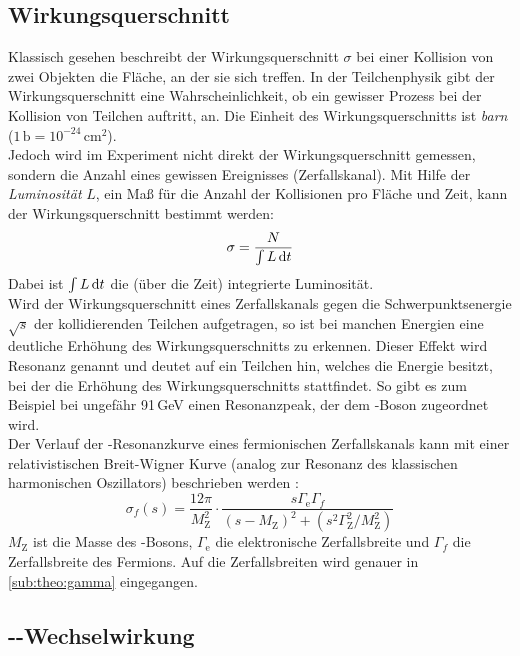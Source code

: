 \subsection{Wirkungsquerschnitt}
Klassisch gesehen beschreibt der Wirkungsquerschnitt $\sigma$ bei einer Kollision von zwei Objekten die Fläche, an der sie sich treffen. 
In der Teilchenphysik gibt der Wirkungsquerschnitt eine Wahrscheinlichkeit, ob ein gewisser Prozess bei der Kollision von Teilchen auftritt, an.
Die Einheit des Wirkungsquerschnitts ist \emph{barn} ($1\,\text{b} = 10^{-24}\,\text{cm}^2$). \\
Jedoch wird im Experiment nicht direkt der Wirkungsquerschnitt gemessen, sondern die Anzahl eines gewissen Ereignisses (Zerfallskanal). Mit Hilfe 
der \emph{Luminosität} $L$, ein Maß für die Anzahl der Kollisionen pro Fläche und Zeit, kann der Wirkungsquerschnitt bestimmt werden:
\begin{equation}
    \sigma = \frac{N}{\int L \, \mathrm{d} t}
\end{equation}
Dabei ist $\int L \, \mathrm{d} t$ die (über die Zeit) integrierte Luminosität. \\
Wird der Wirkungsquerschnitt eines Zerfallskanals gegen die Schwerpunktsenergie $\sqrt{s}$ der kollidierenden Teilchen aufgetragen, so ist  
bei manchen Energien eine deutliche Erhöhung des Wirkungsquerschnitts zu erkennen. Dieser Effekt wird Resonanz genannt und deutet auf ein Teilchen 
hin, welches die Energie besitzt, bei der die Erhöhung des Wirkungsquerschnitts stattfindet. 
So gibt es zum Beispiel bei ungefähr 91\,GeV einen Resonanzpeak, der dem \Z-Boson zugeordnet wird. \\
Der Verlauf der  \Z-Resonanzkurve eines fermionischen Zerfallskanals kann mit einer relativistischen Breit-Wigner Kurve (analog zur Resonanz des 
klassischen harmonischen Oszillators) beschrieben werden \cite{manual}:
\begin{equation}
    \label{eq:sigma:fermion}
    \sigma_f(s) = \frac{12 \pi}{M_\text{Z}^2} \cdot \frac{s \Gamma_\text{e} \Gamma_f}{ \left( s - M_\text{Z} \right)^2 + \left( s^2 \Gamma_\text{Z}^2 / M_\text{Z}^2 \right) }
\end{equation}
$M_\text{Z}$ ist die Masse des \Z-Bosons, $\Gamma_\text{e}$ die elektronische Zerfallsbreite und $\Gamma_f$ die Zerfallsbreite des Fermions. Auf 
die Zerfallsbreiten wird genauer in \autoref{sub:theo:gamma} eingegangen.
\subsection{\texorpdfstring{\elp-\elm}{e+/e-}-Wechselwirkung}
